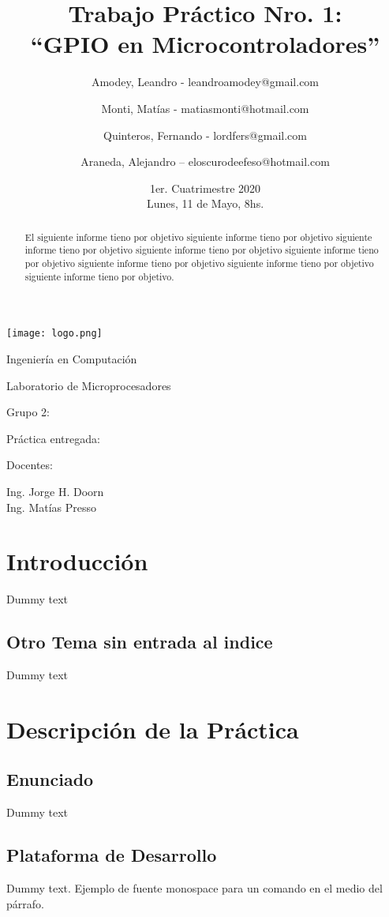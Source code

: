 \documentclass{article}
\title{Trabajo Práctico Nro. 1:\\“GPIO en Microcontroladores”}
\author{Amodey, Leandro - leandroamodey@gmail.com
\and Monti, Matías - matiasmonti@hotmail.com
\and Quinteros, Fernando - lordfers@gmail.com
\and Araneda, Alejandro – eloscurodeefeso@hotmail.com}
\date{1er. Cuatrimestre 2020\\Lunes, 11 de Mayo, 8hs.}
\def\teacher{Ing. Jorge H. Doorn\\Ing. Matías Presso}
\begin{document}
\begin{titlepage}
\makeatletter
\centering
\texttt{[image: logo.png]}\par
{\Large Ingeniería en Computación \par}
\vspace{0.5cm}
{\LARGE Laboratorio de Microprocesadores \par}
\vfill
{\huge \@title \par}
\vfill
Grupo 2:\par
\begin{center}
{\renewcommand{\and}{\par}\@author}    
\end{center}
\vfill
Práctica entregada:\par
\@date
\vfill
Docentes:\par
\teacher
\vspace{1cm}
\makeatother
\end{titlepage}

\renewcommand{\abstractname}{Resumen}
\begin{abstract}
El siguiente informe tieno por objetivo siguiente informe tieno por objetivo siguiente informe tieno por objetivo siguiente informe tieno por objetivo siguiente informe tieno por objetivo siguiente informe tieno por objetivo siguiente informe tieno por objetivo siguiente informe tieno por objetivo.
\end{abstract}

\section{Introducción}
Dummy text

\subsection*{Otro Tema sin entrada al indice}
Dummy text

\section{Descripción de la Práctica}

\subsection{Enunciado}
Dummy text

\subsection{Plataforma de Desarrollo}
Dummy text. Ejemplo de fuente monospace {\ttfamily para un comando} en el medio del párrafo.
\end{document}
